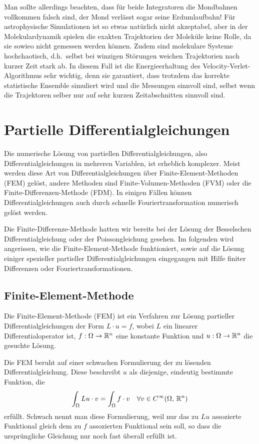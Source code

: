Man sollte allerdings beachten, dass für beide Integratoren die
Mondbahnen vollkommen falsch sind, der Mond verlässt sogar seine
Erdumlaufbahn! Für astrophysische Simulationen ist so etwas natürlich
nicht akzeptabel, aber in der Molekulardynamik spielen die exakten
Trajektorien der Moleküle keine Rolle, da sie sowieo nicht gemessen
werden können. Zudem sind molekulare Systeme hochchaotisch, d.h.\
selbst bei winzigen Störungen weichen Trajektorien nach kurzer Zeit
stark ab. In diesem Fall ist die Energieerhaltung des
Velocity-Verlet-Algorithmus sehr wichtig, denn sie garantiert, dass
trotzdem das korrekte statistische Ensemble simuliert wird und die
Messungen sinnvoll sind, selbst wenn die Trajektoren selber nur auf
sehr kurzen Zeitabschnitten sinnvoll sind.

\section{Partielle Differentialgleichungen}

Die numerische Lösung von partiellen Differentialgleichungen, also
Differentialgleichungen in mehreren Variablen, ist erheblich
komplexer. Meist werden diese Art von Differentialgleichungen über
Finite-Element-Methoden (FEM) gelöst, andere Methoden sind
Finite-Volumen-Methoden (FVM) oder die Finite-Differenzen-Methode
(FDM). In einigen Fällen können Differentialgleichungen auch durch
schnelle Fouriertransformation numerisch gelöst werden.

Die Finite-Differenze-Methode hatten wir bereits bei der Lösung der
Besselschen Differentialgleichung oder der Poissongleichung gesehen.
Im folgenden wird angerissen, wie die Finite-Element-Methode
funktioniert, sowie auf die Lösung einiger spezieller partieller
Differentialgleichungen eingegangen mit Hilfe finiter Differenzen oder
Fouriertransformationen.

\subsection{Finite-Element-Methode}

Die Finite-Element-Methode (FEM) ist ein Verfahren zur Lösung
partieller Differentialgleichungen der Form $L\cdot u = f$, wobei $L$
ein linearer Differentialoperator ist, $f:\Omega\to\mathbb{R}^n$ eine
konstante Funktion und $u:\Omega\to\mathbb{R}^n$ die gesuchte Lösung.

Die FEM beruht auf einer schwachen Formulierung der zu lösenden
Differentialgleichung. Diese beschreibt $u$ als diejenige, eindeutig
bestimmte Funktion, die
\begin{equation}
  \label{eq:fem}
  \int_\Omega Lu\cdot v = \int_\Omega f\cdot v\quad\forall v\in
  C^\infty(\Omega,\, \mathbb{R}^n)
\end{equation}
erfüllt. Schwach nennt man diese Formulierung, weil nur das zu $Lu$
assozierte Funktional gleich dem zu $f$ assozierten Funktional sein
soll, so dass die ursprüngliche Gleichung nur noch fast überall
erfüllt ist.

